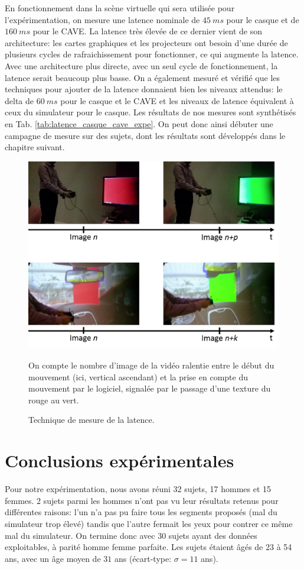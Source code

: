 	\par En fonctionnement dans la scène virtuelle qui sera utilisée pour l'expérimentation, on mesure une latence nominale de $45~ms$ pour le casque et de $160~ms$ pour le CAVE. La latence très élevée de ce dernier vient de son architecture: les cartes graphiques et les projecteurs ont besoin d'une durée de plusieurs cycles de rafraichissement pour fonctionner, ce qui augmente la latence. Avec une architecture plus directe, avec un seul cycle de fonctionnement, la latence serait beaucoup plus basse. On a également mesuré et vérifié que les techniques pour ajouter de la latence donnaient bien les niveaux attendus: le delta de $60~ms$ pour le casque et le CAVE et les niveaux de latence équivalent à ceux du simulateur pour le casque. Les résultats de nos mesures sont synthétisés en Tab. \ref{tab:latence_casque_cave_expe}. On peut donc ainsi débuter une campagne de mesure sur des sujets, dont les résultats sont développés dans le chapitre suivant.
	
	\begin{figure}
		\centering
		\includegraphics[scale=.8]{Figures/LatencyMeasureTechnique}
		\caption{Technique de mesure de la latence.}{On compte le nombre d'image de la vidéo ralentie entre le début du mouvement (ici, vertical ascendant) et la prise en compte du mouvement par le logiciel, signalée par le passage d'une texture du rouge au vert.}
		\label{fig:mesure_latence_video}
	\end{figure}
	
\chapter{Conclusions expérimentales}
	\par Pour notre expérimentation, nous avons réuni 32 sujets, 17 hommes et 15 femmes. 2 sujets parmi les hommes n'ont pas vu leur résultats retenus pour différentes raisons: l'un n'a pas pu faire tous les segments proposés (mal du simulateur trop élevé) tandis que l'autre fermait les yeux pour contrer ce même mal du simulateur. On termine donc avec 30 sujets ayant des données exploitables, à parité homme femme parfaite. Les sujets étaient âgés de 23 à 54 ans, avec un âge moyen de $31$ ans (écart-type: $\sigma = 11$ ans).
	
